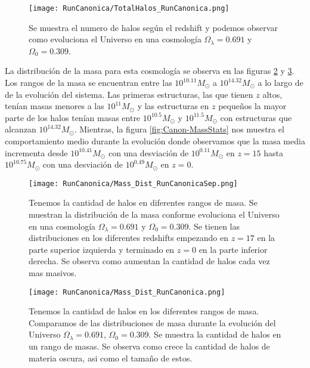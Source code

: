 \begin{figure}[H]
    \centering
    \texttt{[image: RunCanonica/TotalHalos\_RunCanonica.png]}
    \caption[Evolución del número de halos en un Universo $\Omega_\lambda = 0.691 $, $\Omega_0 = 0.309$]{\footnotesize Se muestra el numero de halos según el redshift y podemos observar como evoluciona el Universo en una cosmología $\Omega_\lambda = 0.691 $ y $\Omega_0 = 0.309$.}
    \label{fig:Canon_TotalHalos}
\end{figure}

La distribución de la masa para esta cosmología se observa en las figuras \ref{fig:Canon-MassDistSep} y \ref{fig:Canon-MassDist}. Los rangos de la masa se encuentran entre las $10^{10.11}M_\odot$ a $10^{14.32}M_\odot$ a lo largo de de la evolución del sistema. Las primeras estructuras, las que tienen $z$ altos, tenían masas menores a las $10^{11}M_\odot$ y las estructuras en $z$ pequeños la mayor parte de los halos tenían masas entre $10^{10.5}M_\odot$ y $10^{11.5}M_\odot$ con estructuras que alcanzan $10^{14.32}M_\odot$. Mientras, la figura \ref{fig:Canon-MassStats} nos muestra el comportamiento medio durante la evolución donde observamos que la masa media incrementa desde $10^{10.41}M_\odot$ con una desviación de $10^{0.11}M_\odot$ en $z=15$ hasta $10^{10.75}M_\odot$ con una desviación de $10^{0.49}M_\odot$ en $z=0$.

\begin{figure}[H]
    \centering
    \texttt{[image: RunCanonica/Mass\_Dist\_RunCanonicaSep.png]}
    \caption[Distribución de masa]{\footnotesize Tenemos la cantidad de halos en diferentes rangos de masa. Se muestran la distribución de la masa conforme evoluciona el Universo en una cosmología $\Omega_\lambda = 0.691 $ y $\Omega_0 = 0.309$. Se tienen las distribuciones en los diferentes redshifts empezando en $z=17$ en la parte superior izquierda y terminado en $z=0$ en la parte inferior derecha. Se observa como aumentan la cantidad de halos cada vez mas masivos.}
    \label{fig:Canon-MassDistSep}
\end{figure}

\begin{figure}[H]
    \centering
    \texttt{[image: RunCanonica/Mass\_Dist\_RunCanonica.png]}
    \caption[Comparación de distribución de masa]{\footnotesize Tenemos la cantidad de halos en los diferentes rangos de masa. Comparamos de las distribuciones de masa durante la evolución del Universo $\Omega_\lambda = 0.691 $, $\Omega_0 = 0.309$. Se muestra la cantidad de halos en un rango de masas. Se observa como crece la cantidad de halos de materia oscura, asi como el tamaño de estos.}
    \label{fig:Canon-MassDist}
\end{figure}

